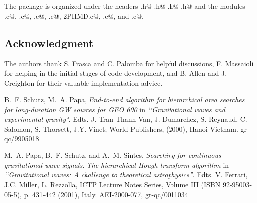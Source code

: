 The package  is organized under the headers
\verb@LUT.h@ \verb@PHMD.h@ \verb@HoughMap.h@  \verb@LALHough.h@ and 
the modules   \verb@PatchGrid.c@,  \verb@Stereographic.c@,  
\verb@ParamPLUT.c@, \verb@ConstructPLUT.c@, 
 \verb@Peak2PHMD.c@,  \verb@HoughMap.c@,  and \verb@DriveHough.c@.

\subsection*{Acknowledgment}
The authors thank S. Frasca and  C. Palomba for helpful discussions,
F. Massaioli for helping in the initial stages of code
development, and B. Allen and J. Creighton for their valuable 
implementation advice.

\newpage
\newpage
\newpage
\newpage


\newpage\begin{thebibliography}{0}

 B.~F. Schutz, M.~A. Papa, 
{\it End-to-end algorithm for hierarchical area searches for 
 long-duration GW sources for GEO 600} in 
  {\it \lq\lq Gravitational waves and experimental gravity"}.
 Edts. J. Tran Thanh Van, J. Dumarchez, S. Reynaud, C. Salomon, S. Thorsett,
J.Y. Vinet; World Publishers,  (2000), Hanoi-Vietnam. gr-qc/9905018
 
 
 M.~A. Papa, B.~F. Schutz, and A.~M. Sintes, 
{\it Searching for continuous gravitational wave signals. The hierarchical Hough
transform algorithm} in 
{\it \lq\lq Gravitational waves: A challenge to theoretical astrophysics''}.
Edts. V. Ferrari, J.C. Miller, L. Rezzolla, 
ICTP Lecture Notes Series, Volume III  (ISBN 92-95003-05-5), p. 431-442 (2001), 
Italy. AEI-2000-077, gr-qc/0011034


\end{thebibliography}
